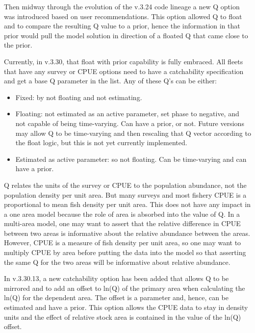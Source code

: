 Then midway through the evolution of the v.3.24 code lineage a new Q option was introduced based on user recommendations. This option allowed Q to float and to compare the resulting Q value to a prior, hence the information in that prior would pull the model solution in direction of a floated Q that came close to the prior.

Currently, in v.3.30, that float with prior capability is fully embraced. All fleets that have any survey or CPUE options need to have a catchability specification and get a base Q parameter in the list. Any of these Q's can be either:

\begin{itemize}
	\item Fixed: by not floating and not estimating.

	\item Floating: not estimated as an active parameter, set phase to negative, and not capable of being time-varying. Can have a prior, or not. Future versions may allow Q to be time-varying and then rescaling that Q vector according to the float logic, but this is not yet currently implemented.

	\item Estimated as active parameter: so not floating. Can be time-varying and can have a prior.
\end{itemize}


Q relates the units of the survey or CPUE to the population abundance, not the population density per unit area. But many surveys and most fishery CPUE is a proportional to mean fish density per unit area. This does not have any impact in a one area model because the role of area is absorbed into the value of Q. In a multi-area model, one may want to assert that the relative difference in CPUE between two areas is informative about the relative abundance between the areas. However, CPUE is a measure of fish density per unit area, so one may want to multiply CPUE by area before putting the data into the model so that asserting the same Q for the two areas will be informative about relative abundance.

In v.3.30.13, a new catchability option has been added that allows Q to be mirrored and to add an offset to ln(Q) of the primary area when calculating the ln(Q) for the dependent area. The offset is a parameter and, hence, can be estimated and have a prior. This option allows the CPUE data to stay in density units and the effect of relative stock area is contained in the value of the ln(Q) offset.

